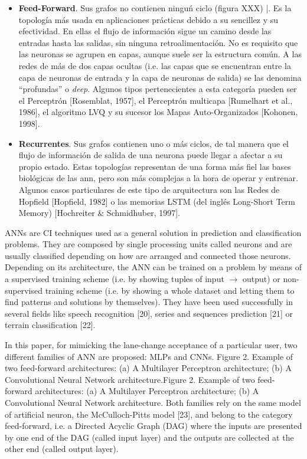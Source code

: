 \begin{itemize}
	\item \textbf{Feed-Forward}. Sus grafos no contienen ninguń ciclo (figura XXX) |. Es la topología más usada en aplicaciones prácticas debido a su sencillez y su efectividad. En ellas el flujo de información sigue un camino desde las entradas hasta las salidas, sin ninguna retroalimentación. No es requisito que las neuronas se agrupen en capas, aunque suele ser la estructura común. A las redes de más de dos capas ocultas (i.e. las capas que se encuentran entre la capa de neuronas de entrada y la capa de neuronas de salida) se las denomina \enquote{profundas} o \textit{deep}. Algunos tipos pertenecientes a esta categoría pueden ser el Perceptrón [Rosemblat, 1957], el Perceptrón multicapa [Rumelhart et al., 1986], el algoritmo LVQ y su sucesor los Mapas Auto-Organizados [Kohonen, 1998].
	\item \textbf{Recurrentes}. Sus grafos contienen uno o más ciclos, de tal manera que el flujo de información de salida de una neurona puede llegar a afectar a su propio estado. Estas topologías representan de una forma más fiel las bases biológicas de las \ac{ann}, pero son más complejas a la hora de operar y entrenar. Algunos casos particulares de este tipo de arquitectura son las Redes de Hopfield [Hopfield, 1982] o las memorias LSTM (del inglés Long-Short Term Memory) [Hochreiter \& Schmidhuber, 1997].
\end{itemize}


ANNs are CI techniques used as a general solution in prediction and classification problems. They are composed by single processing units called neurons and are usually classified depending on how are arranged and connected those neurons. Depending on its architecture, the ANN can be trained on a problem by means of a supervised training scheme (i.e. by showing tuples of input $\rightarrow$ output) or non-supervised training scheme (i.e. by showing a whole dataset and letting them to find patterns and solutions by themselves). They have been used successfully in several fields like speech recognition [20], series and sequences prediction [21] or terrain classification [22].

In this paper, for mimicking the lane-change acceptance of a particular user, two different families of ANN are proposed: MLPs and CNNs. Figure 2. Example of two feed-forward architectures: (a) A Multilayer Perceptron architecture; (b) A Convolutional Neural Network architecture.Figure 2. Example of two feed-forward architectures: (a) A Multilayer Perceptron architecture; (b) A Convolutional Neural Network architecture. Both families rely on the same model of artificial neuron, the McCulloch-Pitts model [23], and belong to the category feed-forward, i.e. a Directed Acyclic Graph (DAG) where the inputs are presented by one end of the DAG (called input layer) and the outputs are collected at the other end (called output layer).

